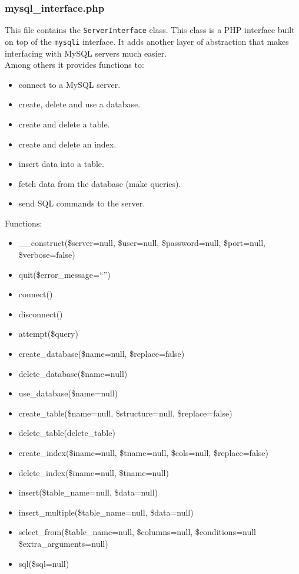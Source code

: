 \documentclass{article}
\begin{document}
\subsubsection{mysql\_interface.php}
This file contains the \texttt{ServerInterface} class. This class is a PHP
interface built on top of the \texttt{mysqli} interface. It adds another
layer of abstraction that makes interfacing with MySQL servers much easier.
\\Among others it provides functions to:
\begin{itemize}
	\item connect to a MySQL server.
	\item create, delete and use a database.
	\item create and delete a table.
	\item create and delete an index.
	\item insert data into a table.
	\item fetch data from the database (make queries).
	\item send SQL commands to the server.
\end{itemize}
Functions:
\begin{itemize}
	\item \_\_construct(\$server=null, \$user=null, \$password=null,
	\$port=null, \$verbose=false)
	\item quit(\$error\_message=\textquotedblleft\textquotedblright)
	\item connect()
	\item disconnect()
	\item attempt(\$query)
	\item create\_database(\$name=null, \$replace=false)
	\item delete\_database(\$name=null)
	\item use\_database(\$name=null)
	\item create\_table(\$name=null, \$structure=null, \$replace=false)
	\item delete\_table(delete\_table)
	\item create\_index(\$iname=null, \$tname=null, \$cols=null,
	\$replace=false)
	\item delete\_index(\$iname=null, \$tname=null)
	\item insert(\$table\_name=null, \$data=null)
	\item insert\_multiple(\$table\_name=null, \$data=null)
	\item select\_from(\$table\_name=null, \$columns=null, \$conditions=null
	\$extra\_arguments=null)
	\item sql(\$sql=null)
\end{itemize}
\end{document}
